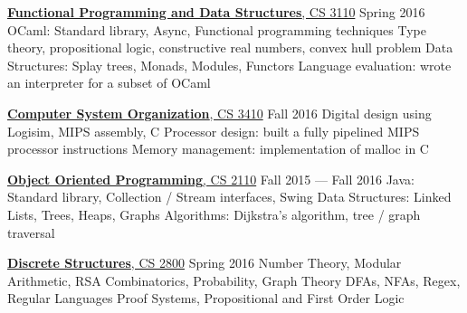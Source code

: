 \documentclass[letterpaper,10pt,oneside]{simpleresume}
\begin{document}
\begin{minipage}[t][0pt]{\linewidth}
\begin{body}
\href{https://www.cs.cornell.edu/courses/cs3110/2016sp/}
{\textbf{Functional Programming and Data Structures}, CS 3110}
\hfill Spring 2016
\BulletItem%
OCaml: Standard library, Async, Functional programming techniques
\BulletItem%
Type theory, propositional logic, constructive real numbers, convex hull problem
\BulletItem%
Data Structures: Splay trees, Monads, Modules, Functors
\BulletItem%
Language evaluation: wrote an interpreter for a subset of OCaml

\href{https://www.cs.cornell.edu/courses/cs3410/2016fa/}
{\textbf{Computer System Organization}, CS 3410}
\hfill Fall 2016
\BulletItem%
Digital design using Logisim, MIPS assembly, C
\BulletItem%
Processor design: built a fully pipelined MIPS processor
instructions
\BulletItem%
Memory management: implementation of malloc in C

\href{https://www.cs.cornell.edu/courses/cs2110/2015fa/}
{\textbf{Object Oriented Programming}, CS 2110}
\hfill Fall 2015 --- Fall 2016
\BulletItem%
Java: Standard library, Collection / Stream interfaces, Swing
\BulletItem%
Data Structures: Linked Lists, Trees, Heaps, Graphs
\BulletItem%
Algorithms: Dijkstra's algorithm, tree / graph traversal

\href{https://www.cs.cornell.edu/courses/cs2800/2016sp/}
{\textbf{Discrete Structures}, CS 2800}
\hfill Spring 2016
\BulletItem%
Number Theory, Modular Arithmetic, RSA
\BulletItem%
Combinatorics, Probability, Graph Theory
\BulletItem%
DFAs, NFAs, Regex, Regular Languages
\BulletItem%
Proof Systems, Propositional and First Order Logic



\end{body}
\end{minipage}
\end{document}
